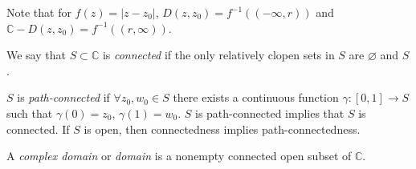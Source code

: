 Note that for $f(z) = |z - z_0|$, $D(z, z_0) = f^{-1}((-\infty, r))$
and $\mathbb{C} - D(z, z_0) = f^{-1}((r, \infty))$.

\begin{defn}
  We say that $S \subset \mathbb{C}$ is \emph{connected} if the only
  relatively clopen sets in $S$ are $\varnothing$ and $S$.

  $S$ is \emph{path-connected} if $\forall z_0, w_0 \in S$ there exists
  a continuous function $\gamma : [0, 1] \to S$ such that $\gamma(0) = z_0$,
  $\gamma(1) = w_0$. $S$ is path-connected implies that $S$ is connected.
  If $S$ is open, then connectedness implies path-connectedness.
\end{defn}

\begin{defn}
  A \emph{complex domain} or \emph{domain} is a nonempty connected open
  subset of $\mathbb{C}$.
\end{defn}
